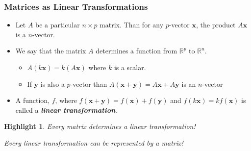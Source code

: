 \documentclass{beamer}
\newcommand{\Real}{\ensuremath{\mathbb{R}}}
\newcommand{\Mtx}[1]{\ensuremath{\mathbf{#1}}}
\newtheorem{Highlight}{Highlight}
\begin{document}
\begin{frame}
  \frametitle{Matrices as Linear Transformations}

\begin{itemize}  

\item Let $A$ be a particular $n \times p$ matrix. Than for any $p$-vector \Mtx{x}, the product $A\Mtx{x}$ is a $n$-vector.

\item We say that the matrix $A$ determines a function from $\Real^p$ to $\Real^n$.  

\begin{itemize}
\item $A(k \Mtx{x}) = k(A \Mtx{x})$ where $k$ is a scalar.
\item If \Mtx{y} is also a $p$-vector than $A(\Mtx{x}+\Mtx{y}) = A\Mtx{x} + A\Mtx{y}$ is  an $n$-vector
\end{itemize}


\item A function, $\mathit{f}$, where $\mathit{f}(\Mtx{x} + \Mtx{y}) = \mathit{f}(\Mtx{x}) + \mathit{f}(\Mtx{y})$ and $\mathit{f}(k\Mtx{x}) = k\mathit{f}(\Mtx{x})$ is called a \emph{\textbf{linear transformation}}.

\end{itemize}

\begin{Highlight}
Every matrix determines a linear transformation!

\medskip

Every linear transformation can be represented by a matrix!
\end{Highlight}

\end{frame}
\end{document}
